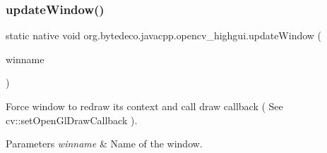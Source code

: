 \subsubsection{\texorpdfstring{update\+Window()}{updateWindow()}}
{\footnotesize\ttfamily static native void org.\+bytedeco.\+javacpp.\+opencv\+\_\+highgui.\+update\+Window (\begin{DoxyParamCaption}\item[{@Str Byte\+Pointer}]{winname }\end{DoxyParamCaption})\hspace{0.3cm}{\ttfamily [static]}}



Force window to redraw its context and call draw callback ( See cv\+::set\+Open\+Gl\+Draw\+Callback ). 


\begin{DoxyParams}{Parameters}
{\em winname} & Name of the window. \\
\hline
\end{DoxyParams}
